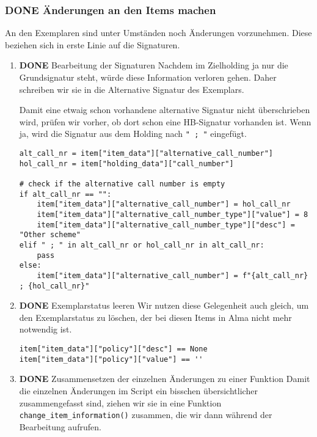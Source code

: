 \documentclass[10pt, a4paper]{scrartcl}
\begin{document}
\subsubsection{{\bfseries\sffamily DONE} Änderungen an den Items machen}
\label{sec:orge72c9e0}
An den Exemplaren sind unter Umständen noch Änderungen vorzunehmen. Diese
beziehen sich in erste Linie auf die Signaturen.
\begin{enumerate}
\item {\bfseries\sffamily DONE} Bearbeitung der Signaturen
\label{sec:org2387f05}
Nachdem im Zielholding ja nur die Grundsignatur steht, würde diese
Information verloren gehen. Daher schreiben wir sie in die Alternative
Signatur des Exemplars.

Damit eine etwaig schon vorhandene alternative Signatur nicht
überschrieben wird, prüfen wir vorher, ob dort schon eine HB-Signatur
vorhanden ist. Wenn ja, wird die Signatur aus dem Holding nach \texttt{" ; "}
eingefügt.

\begin{verbatim}
alt_call_nr = item["item_data"]["alternative_call_number"]
hol_call_nr = item["holding_data"]["call_number"]

# check if the alternative call number is empty
if alt_call_nr == "":
    item["item_data"]["alternative_call_number"] = hol_call_nr
    item["item_data"]["alternative_call_number_type"]["value"] = 8
    item["item_data"]["alternative_call_number_type"]["desc"] = "Other scheme"
elif " ; " in alt_call_nr or hol_call_nr in alt_call_nr:
    pass
else:
    item["item_data"]["alternative_call_number"] = f"{alt_call_nr} ; {hol_call_nr}"

\end{verbatim}
\item {\bfseries\sffamily DONE} Exemplarstatus leeren
\label{sec:orgc41d725}
Wir nutzen diese Gelegenheit auch gleich, um den Exemplarstatus zu
löschen, der bei diesen Items in Alma nicht mehr notwendig ist.

\begin{verbatim}
item["item_data"]["policy"]["desc"] == None
item["item_data"]["policy"]["value"] == ''
\end{verbatim}

\item {\bfseries\sffamily DONE} Zusammensetzen der einzelnen Änderungen zu einer Funktion
\label{sec:org36d5015}
Damit die einzelnen Änderungen im Script ein bisschen übersichtlicher
zusammengefasst sind, ziehen wir sie in eine Funktion
\texttt{change\_item\_information()} zusammen, die wir dann während der
Bearbeitung aufrufen.


\end{enumerate}
\end{document}
